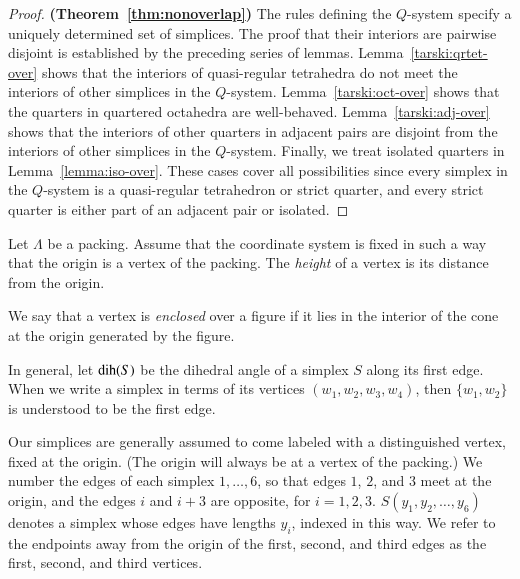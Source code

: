 \begin{proof} {\bf (Theorem~\ref{thm:nonoverlap})}
The rules defining the $Q$-system specify a uniquely determined
set of simplices.  The proof that their interiors are pairwise
disjoint is established by the preceding series of lemmas.
Lemma~\ref{tarski:qrtet-over} shows that the interiors of
quasi-regular tetrahedra do not meet the interiors of other
simplices in the $Q$-system. Lemma~\ref{tarski:oct-over} shows that
the quarters in quartered octahedra are well-behaved.
Lemma~\ref{tarski:adj-over} shows that the interiors of other
quarters in adjacent pairs are disjoint from the interiors of
other simplices in the $Q$-system. Finally, we treat isolated
quarters in Lemma~\ref{lemma:iso-over}. These cases cover all
possibilities since every simplex in the $Q$-system is a
quasi-regular tetrahedron or strict quarter, and every strict
quarter is either part of an adjacent pair or isolated.
\end{proof}


\begin{definition} \label{def:height}  Let $\Lambda$ be a
packing.  Assume that the coordinate system is fixed in
such a way that the origin is a vertex of the packing.  The {\it
height\/} of a vertex is its distance from the origin.
%
\end{definition}

\begin{definition} \label{def:enclosed}
We say that a vertex is {\it enclosed\/} over a figure if it lies
in the interior of the cone at the origin generated by the figure.
%
\end{definition}

\begin{definition}\label{def:dih}
In general, let $\operatorname{dih}(S)$ be the dihedral angle of a simplex $S$
along its first edge. When we write a simplex in terms of its
vertices $(w_1,w_2,w_3,w_4)$, then $\{w_1,w_2\}$ is understood to
be the first edge.
%
\end{definition}


Our simplices are generally assumed to come labeled with a
distinguished vertex, fixed  at the origin. (The origin will
always be at a vertex of the packing.) We number the edges of each
simplex $1,\ldots,6$, so that edges $1$, $2$, and $3$ meet at the
origin, and the edges $i$ and $i+3$ are opposite, for $i=1,2,3$.
$S(y_1,y_2,\ldots,y_6)$ denotes a simplex whose edges have lengths
$y_i$, indexed in this way. We refer to the endpoints away from
the origin of the first, second, and third edges as the first,
second, and third vertices.
%



